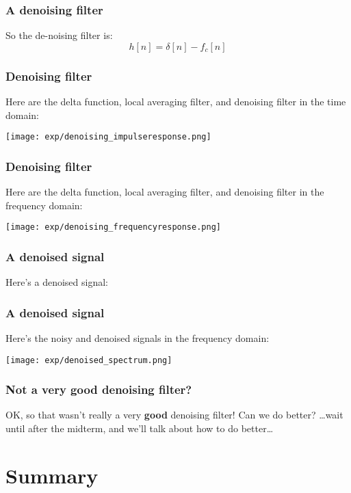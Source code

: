 \documentclass{beamer}
\begin{document}
\begin{frame}
  \frametitle{A denoising  filter}

  So the de-noising filter is:
  \[
  h[n] = \delta[n]-f_c[n]
  \]
\end{frame}

\begin{frame}
  \frametitle{Denoising filter}

  Here are the delta function, local averaging filter, and denoising filter in the time domain:
  \centerline{\texttt{[image: exp/denoising\_impulseresponse.png]}}
\end{frame}

\begin{frame}
  \frametitle{Denoising filter}

  Here are the delta function, local averaging filter, and denoising filter in the frequency domain:
  \centerline{\texttt{[image: exp/denoising\_frequencyresponse.png]}}
\end{frame}

\begin{frame}
  \frametitle{A denoised signal}

  Here's a denoised signal:
  \centerline{}
\end{frame}

\begin{frame}
  \frametitle{A denoised signal}

  Here's the noisy and denoised signals in the frequency domain:
  \centerline{\texttt{[image: exp/denoised\_spectrum.png]}}
\end{frame}

\begin{frame}
  \frametitle{Not a very good denoising filter?}

  OK, so that wasn't really a very {\bf good} denoising filter!
  Can we do better?
  \ldots wait until after the midterm, and we'll talk about how to do better\ldots
\end{frame}

\section[Summary]{Summary}
\setcounter{subsection}{1}
\end{document}
